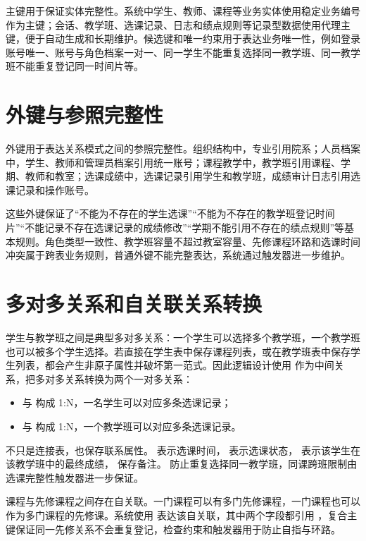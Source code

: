 主键用于保证实体完整性。系统中学生、教师、课程等业务实体使用稳定业务编号作为主键；会话、教学班、选课记录、日志和绩点规则等记录型数据使用代理主键，便于自动生成和长期维护。候选键和唯一约束用于表达业务唯一性，例如登录账号唯一、账号与角色档案一对一、同一学生不能重复选择同一教学班、同一教学班不能重复登记同一时间片等。

\section{外键与参照完整性}

外键用于表达关系模式之间的参照完整性。组织结构中，专业引用院系；人员档案中，学生、教师和管理员档案引用统一账号；课程教学中，教学班引用课程、学期、教师和教室；选课成绩中，选课记录引用学生和教学班，成绩审计日志引用选课记录和操作账号。

这些外键保证了“不能为不存在的学生选课”“不能为不存在的教学班登记时间片”“不能记录不存在选课记录的成绩修改”“学期不能引用不存在的绩点规则”等基本规则。角色类型一致性、教学班容量不超过教室容量、先修课程环路和选课时间冲突属于跨表业务规则，普通外键不能完整表达，系统通过触发器进一步维护。

\section{多对多关系和自关联关系转换}

学生与教学班之间是典型多对多关系：一个学生可以选择多个教学班，一个教学班也可以被多个学生选择。若直接在学生表中保存课程列表，或在教学班表中保存学生列表，都会产生非原子属性并破坏第一范式。因此逻辑设计使用  作为中间关系，把多对多关系转换为两个一对多关系：

\begin{itemize}
  \item {} 与  构成 1:N，一名学生可以对应多条选课记录；
  \item {} 与  构成 1:N，一个教学班可以对应多条选课记录。
\end{itemize}

 不只是连接表，也保存联系属性。 表示选课时间， 表示选课状态， 表示该学生在该教学班中的最终成绩， 保存备注。 防止重复选择同一教学班，同课跨班限制由选课完整性触发器进一步保证。

课程与先修课程之间存在自关联。一门课程可以有多门先修课程，一门课程也可以作为多门课程的先修课。系统使用  表达该自关联，其中两个字段都引用 ，复合主键保证同一先修关系不会重复登记，检查约束和触发器用于防止自指与环路。

